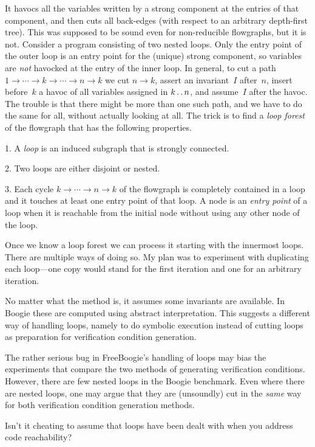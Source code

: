 \A It havocs all the variables written by a strong component at the entries
of that component, and then cuts all back-edges (with respect to an
arbitrary depth-first tree).  This was supposed to be sound even for
non-reducible flowgraphs, but it is not. Consider a program consisting of
two nested loops. Only the entry point of the outer loop is an entry point
for the (unique) strong component, so variables are {\it not\/} havocked at
the entry of the inner loop. In general, to cut a path $1\to\cdots\to
k\to\cdots\to n\to k$ we cut $n\to k$, assert an invariant~$I$ after~$n$,
insert before~$k$ a havoc of all variables assigned in $k\mathinner{\ldotp\ldotp} n$, and
assume~$I$ after the havoc. The trouble is that there might be more than
one such path, and we have to do the same for all, without actually looking
at all. The trick is to find a {\it loop forest\/} of the flowgraph that
has the following properties.
\item{1.} A {\it loop\/} is an induced subgraph that is strongly connected.
\item{2.} Two loops are either disjoint or nested.
\item{3.} Each cycle $k\to\cdots\to n\to k$ of the flowgraph is completely
contained in a loop and it touches at least one entry point of that loop.
A node is an {\it entry point\/} of a loop when it is reachable from the
initial node without using any other node of the loop.

\noindent Once we know a loop forest we can process it starting with the
innermost loops. There are multiple ways of doing so. My plan was to
experiment with duplicating each loop---one copy would stand for the first
iteration and one for an arbitrary iteration.

No matter what the method is, it assumes some invariants are available.  In
Boogie these are computed using abstract interpretation. This suggests a
different way of handling loops, namely to do symbolic execution instead of
cutting loops as preparation for verification condition generation.

The rather serious bug in FreeBoogie's handling of loops may bias the
experiments that compare the two methods of generating verification
conditions. However, there are few nested loops in the Boogie benchmark.
Even where there are nested loops, one may argue that they are (unsoundly)
cut in the {\it same\/} way for both verification condition generation
methods.

\Q Isn't it cheating to assume that loops have been dealt with when you
address code reachability?

